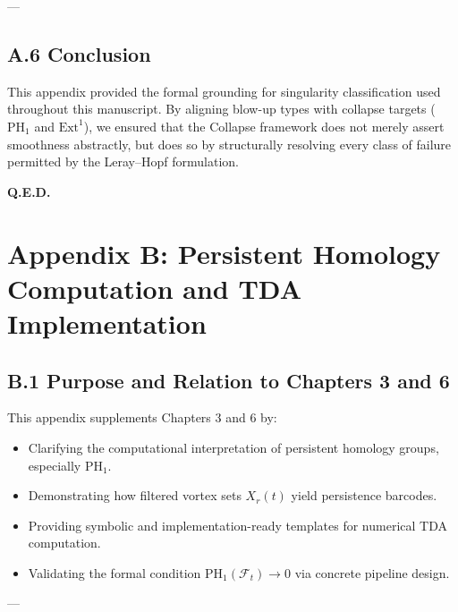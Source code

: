 \documentclass[11pt]{article}
\begin{document}
---

\subsection*{A.6 Conclusion}

This appendix provided the formal grounding for singularity classification used throughout this manuscript.  
By aligning blow-up types with collapse targets (\( \mathrm{PH}_1 \) and \( \mathrm{Ext}^1 \)),  
we ensured that the Collapse framework does not merely assert smoothness abstractly,  
but does so by structurally resolving every class of failure permitted by the Leray–Hopf formulation.

\begin{flushright}
\textbf{Q.E.D.}
\end{flushright}




\section*{Appendix B: Persistent Homology Computation and TDA Implementation}

\subsection*{B.1 Purpose and Relation to Chapters 3 and 6}

This appendix supplements Chapters 3 and 6 by:

\begin{itemize}
  \item Clarifying the computational interpretation of persistent homology groups, especially \( \mathrm{PH}_1 \).
  \item Demonstrating how filtered vortex sets \( X_r(t) \) yield persistence barcodes.
  \item Providing symbolic and implementation-ready templates for numerical TDA computation.
  \item Validating the formal condition \( \mathrm{PH}_1(\mathcal{F}_t) \to 0 \) via concrete pipeline design.
\end{itemize}

---
\end{document}
